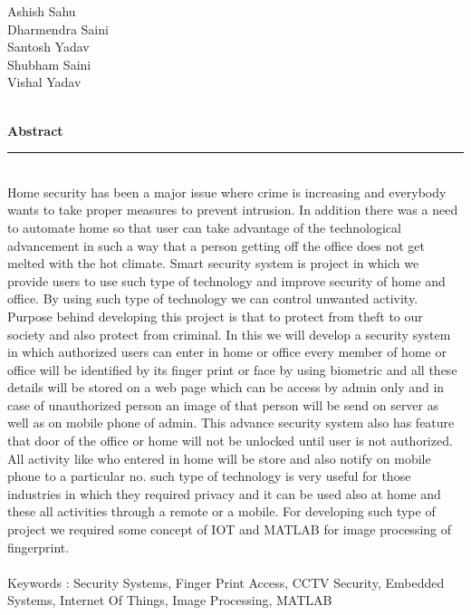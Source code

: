 \documentclass[twoside,a4paper,16pt]{book}
\begin{document}
{{{				
				\vspace{2cm}
				Ashish Sahu\\
				Dharmendra Saini\\
				Santosh Yadav\\
				Shubham Saini\\
				Vishal Yadav\\ \\}
			\newpage
			\begin{center}
				\huge{\bf Abstract}
			\end{center}
{\rule{190mm}{0.2mm}}		
			\vspace{1.5cm}
			\\
			\large Home security has been a major issue where crime is increasing and everybody wants to take proper measures to
			prevent intrusion. In addition there was a need to automate home so that user can take advantage of the technological
			advancement in such a way that a person getting off the office does not get melted with the hot climate. Smart
			security system is project in which we provide users to use such type of technology and improve security of home and
			office. By using such type of technology we can control unwanted activity. Purpose behind developing this project is
			that to protect from theft to our society and also protect from criminal. In this we will develop a security system in
			which authorized users can enter in home or office every member of home or office will be identified by its finger print
			or face by using biometric and all these details will be stored on a web page which can be access by admin only and
			in case of unauthorized person an image of that person will be send on server as well as on mobile phone of admin.
			This advance security system also has feature that door of the office or home will not be unlocked until user is not
			authorized. All activity like who entered in home will be store and also notify on mobile phone to a particular no.
			such type of technology is very useful for those industries in which they required privacy and it can be used also at
			home and these all activities through a remote or a mobile. For developing such type of project we required some
			concept of IOT and MATLAB for image processing of fingerprint.\\\\
			Keywords : Security Systems, Finger Print Access, CCTV Security, Embedded Systems, Internet Of Things, Image
			Processing, MATLAB\\
			
}}
\end{document}
